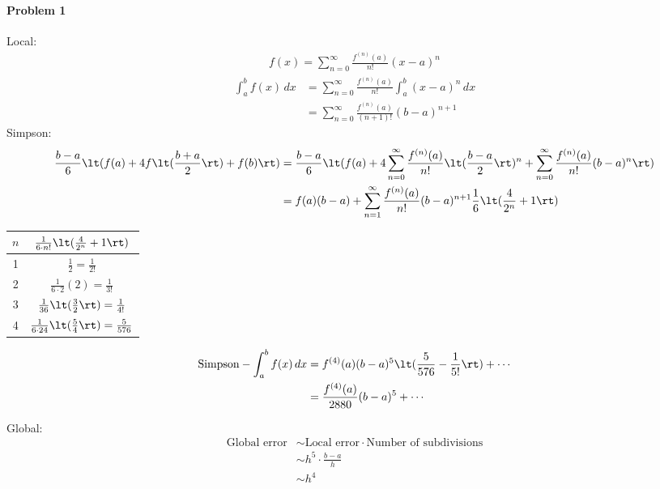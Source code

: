 \documentclass[12pt, oneside, letterpaper, fleqn]{article}
\begin{document}
\paragraph{Problem 1}
Local:
\begin{align*}
f(x) = \sum_{n=0}^\infty \frac{f^{(n)}(a)}{n!}(x-a)^n
\end{align*}
\begin{align*}
\int_a^b f(x)\,dx &= \sum_{n=0}^\infty \frac{f^{(n)}(a)}{n!} \int_a^b
(x-a)^n\,dx\\
&= \sum_{n=0}^\infty \frac{f^{(n)}(a)}{(n+1)!} (b-a)^{n+1}
\end{align*}
Simpson:
\begin{align*}
\frac{b-a}{6}\lt(f(a) + 4f\lt(\frac{b+a}{2}\rt) + f(b)\rt)
&= \frac{b-a}{6}\lt(f(a) + 4\sum_{n=0}^\infty \frac{f^{(n)}(a)}{n!}
\lt(\frac{b-a}{2}\rt)^n + \sum_{n=0}^\infty \frac{f^{(n)}(a)}{n!}
(b-a)^n \rt)\\
&= f(a)(b-a) + \sum_{n=1}^\infty \frac{f^{(n)}(a)}{n!}(b-a)^{n+1}
\frac{1}{6}\lt(\frac{4}{2^n} + 1\rt)
\end{align*}
\begin{table}[htbp]
\renewcommand{\arraystretch}{2}
\begin{tabular}{c | c}
\hline\hline
$n$ & $\frac{1}{6 \cdot n!}\lt(\frac{4}{2^n}+1\rt)$\\
\hline
1 & $\frac{1}{2} = \frac{1}{2!}$\\
2 & $\frac{1}{6\cdot 2}(2) = \frac{1}{3!}$\\
3 & $\frac{1}{36}\lt(\frac{3}{2}\rt) = \frac{1}{4!}$\\
4 & $\frac{1}{6\cdot 24}\lt(\frac{5}{4}\rt) = \frac{5}{576}$\\
\hline
\end{tabular}
\end{table}

\begin{align*}
\text{Simpson} - \int_a^b f(x)\,dx &= f^{(4)}(a)(b-a)^{5}
\lt(\frac{5}{576} - \frac{1}{5!}\rt) + \dotsb\\
&= \frac{f^{(4)}(a)}{2880} (b-a)^{5} + \dotsb
\end{align*}

Global:
\begin{align*}
\text{Global error} &\sim \text{Local error} \cdot \text{Number of
subdivisions}\\
&\sim h^5 \cdot \frac{b-a}{h}\\
&\sim h^4
\end{align*}
\end{document}
